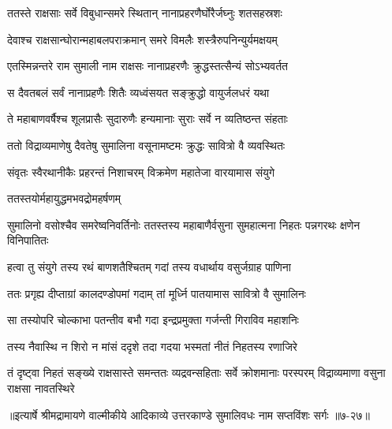 \twolineshloka
{ततस्ते राक्षसाः सर्वे विबुधान्समरे स्थितान्}
{नानाप्रहरणैर्घोरैर्जघ्नुः शतसहस्रशः} %

\twolineshloka
{देवाश्च राक्षसान्घोरान्महाबलपराक्रमान्}
{समरे विमलैः शस्त्रैरुपनिन्युर्यमक्षयम्} %

\twolineshloka
{एतस्मिन्नन्तरे राम सुमाली नाम राक्षसः}
{नानाप्रहरणैः क्रुद्धस्तत्सैन्यं सोऽभ्यवर्तत} %

\twolineshloka
{स दैवतबलं सर्वं नानाप्रहणैः शितैः}
{व्यध्वंसयत सङ्क्रुद्धो वायुर्जलधरं यथा} %

\twolineshloka
{ते महाबाणवर्षैश्च शूलप्रासैः सुदारुणैः}
{हन्यमानाः सुराः सर्वे न व्यतिष्ठन्त संहताः} %

\twolineshloka
{ततो विद्राव्यमाणेषु दैवतेषु सुमालिना}
{वसूनामष्टमः क्रुद्धः सावित्रो वै व्यवस्थितः} %

\twolineshloka
{संवृतः स्वैरथानीकैः प्रहरन्तं निशाचरम्}
{विक्रमेण महातेजा वारयामास संयुगे} %

\onelineshloka
{ततस्तयोर्महायुद्धमभवद्रोमहर्षणम्} %

\threelineshloka
{सुमालिनो वसोश्चैव समरेष्वनिवर्तिनोः}
{ततस्तस्य महाबाणैर्वसुना सुमहात्मना}
{निहतः पन्नगरथः क्षणेन विनिपातितः} %

\twolineshloka
{हत्वा तु संयुगे तस्य रथं बाणशतैश्चितम्}
{गदां तस्य वधार्थाय वसुर्जग्राह पाणिना} %

\twolineshloka
{ततः प्रगृह्य दीप्ताग्रां कालदण्डोपमां गदाम्}
{तां मूर्ध्नि पातयामास सावित्रो वै सुमालिनः} %

\twolineshloka
{सा तस्योपरि चोल्काभा पतन्तीव बभौ गदा}
{इन्द्रप्रमुक्ता गर्जन्ती गिराविव महाशनिः} %

\twolineshloka
{तस्य नैवास्थि न शिरो न मांसं ददृशे तदा}
{गदया भस्मतां नीतं निहतस्य रणाजिरे} %

\threelineshloka
{तं दृष्ट्वा निहतं सङ्ख्ये राक्षसास्ते समन्ततः}
{व्यद्रवन्सहिताः सर्वे क्रोशमानाः परस्परम्}
{विद्राव्यमाणा वसुना राक्षसा नावतस्थिरे} %


॥इत्यार्षे श्रीमद्रामायणे वाल्मीकीये आदिकाव्ये उत्तरकाण्डे सुमालिवधः नाम सप्तविंशः सर्गः ॥७-२७॥
